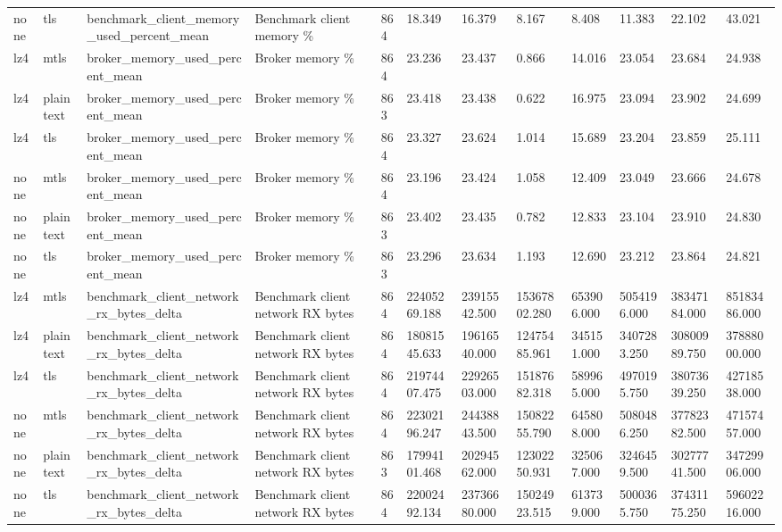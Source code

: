 \begin{longtable}{llllllllllll}
none & tls & benchmark\_client\_memory\_used\_percent\_mean & Benchmark client memory \% & 864 & 18.349 & 16.379 & 8.167 & 8.408 & 11.383 & 22.102 & 43.021 \\
lz4 & mtls & broker\_memory\_used\_percent\_mean & Broker memory \% & 864 & 23.236 & 23.437 & 0.866 & 14.016 & 23.054 & 23.684 & 24.938 \\
lz4 & plaintext & broker\_memory\_used\_percent\_mean & Broker memory \% & 863 & 23.418 & 23.438 & 0.622 & 16.975 & 23.094 & 23.902 & 24.699 \\
lz4 & tls & broker\_memory\_used\_percent\_mean & Broker memory \% & 864 & 23.327 & 23.624 & 1.014 & 15.689 & 23.204 & 23.859 & 25.111 \\
none & mtls & broker\_memory\_used\_percent\_mean & Broker memory \% & 864 & 23.196 & 23.424 & 1.058 & 12.409 & 23.049 & 23.666 & 24.678 \\
none & plaintext & broker\_memory\_used\_percent\_mean & Broker memory \% & 863 & 23.402 & 23.435 & 0.782 & 12.833 & 23.104 & 23.910 & 24.830 \\
none & tls & broker\_memory\_used\_percent\_mean & Broker memory \% & 863 & 23.296 & 23.634 & 1.193 & 12.690 & 23.212 & 23.864 & 24.821 \\
lz4 & mtls & benchmark\_client\_network\_rx\_bytes\_delta & Benchmark client network RX bytes & 864 & 22405269.188 & 23915542.500 & 15367802.280 & 653906.000 & 5054196.000 & 38347184.000 & 85183486.000 \\
lz4 & plaintext & benchmark\_client\_network\_rx\_bytes\_delta & Benchmark client network RX bytes & 864 & 18081545.633 & 19616540.000 & 12475485.961 & 345151.000 & 3407283.250 & 30800989.750 & 37888000.000 \\
lz4 & tls & benchmark\_client\_network\_rx\_bytes\_delta & Benchmark client network RX bytes & 864 & 21974407.475 & 22926503.000 & 15187682.318 & 589965.000 & 4970195.750 & 38073639.250 & 42718538.000 \\
none & mtls & benchmark\_client\_network\_rx\_bytes\_delta & Benchmark client network RX bytes & 864 & 22302196.247 & 24438843.500 & 15082255.790 & 645808.000 & 5080486.250 & 37782382.500 & 47157457.000 \\
none & plaintext & benchmark\_client\_network\_rx\_bytes\_delta & Benchmark client network RX bytes & 863 & 17994101.468 & 20294562.000 & 12302250.931 & 325067.000 & 3246459.500 & 30277741.500 & 34729906.000 \\
none & tls & benchmark\_client\_network\_rx\_bytes\_delta & Benchmark client network RX bytes & 864 & 22002492.134 & 23736680.000 & 15024923.515 & 613739.000 & 5000365.750 & 37431175.250 & 59602216.000 \\

\end{longtable}
